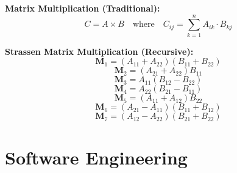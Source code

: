 

\pagebreak



\textbf{Matrix Multiplication (Traditional):}
\begin{equation}
    C = A \times B \quad \text{where} \quad C_{ij} = \sum_{k=1}^{n} A_{ik} \cdot B_{kj}
\end{equation}



\textbf{Strassen Matrix Multiplication (Recursive):}
\begin{equation}
    \mathbf{M}_1 = (A_{11} + A_{22})(B_{11} + B_{22})
\end{equation}
\begin{equation}
    \mathbf{M}_2 = (A_{21} + A_{22})B_{11}
\end{equation}
\begin{equation}
    \mathbf{M}_3 = A_{11}(B_{12} - B_{22})
\end{equation}
\begin{equation}
    \mathbf{M}_4 = A_{22}(B_{21} - B_{11})
\end{equation}
\begin{equation}
    \mathbf{M}_5 = (A_{11} + A_{12})B_{22}
\end{equation}
\begin{equation}
    \mathbf{M}_6 = (A_{21} - A_{11})(B_{11} + B_{12})
\end{equation}
\begin{equation}
    \mathbf{M}_7 = (A_{12} - A_{22})(B_{21} + B_{22})
\end{equation}


\section*{Software Engineering}

